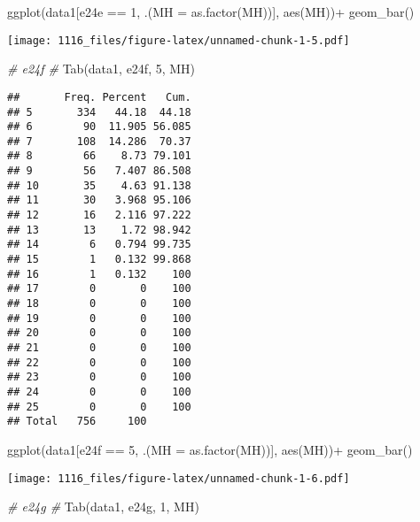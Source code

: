 \documentclass[
]{article}
\newenvironment{Shaded}{\begin{snugshade}}{\end{snugshade}}
\newcommand{\AttributeTok}[1]{\textcolor[rgb]{0.77,0.63,0.00}{#1}}
\newcommand{\CommentTok}[1]{\textcolor[rgb]{0.56,0.35,0.01}{\textit{#1}}}
\newcommand{\DecValTok}[1]{\textcolor[rgb]{0.00,0.00,0.81}{#1}}
\newcommand{\FunctionTok}[1]{\textcolor[rgb]{0.00,0.00,0.00}{#1}}
\newcommand{\NormalTok}[1]{#1}
\newcommand{\SpecialCharTok}[1]{\textcolor[rgb]{0.00,0.00,0.00}{#1}}
\newcommand{\StringTok}[1]{\textcolor[rgb]{0.31,0.60,0.02}{#1}}
\begin{document}
\begin{Shaded}
\begin{Highlighting}[]
\FunctionTok{ggplot}\NormalTok{(data1[e24e }\SpecialCharTok{==} \DecValTok{1}\NormalTok{, .(}\AttributeTok{MH =} \FunctionTok{as.factor}\NormalTok{(MH))], }\FunctionTok{aes}\NormalTok{(MH))}\SpecialCharTok{+}
    \FunctionTok{geom\_bar}\NormalTok{()}
\end{Highlighting}
\end{Shaded}

\texttt{[image: 1116\_files/figure-latex/unnamed-chunk-1-5.pdf]}

\begin{Shaded}
\begin{Highlighting}[]
\CommentTok{\# e24f \#}
\FunctionTok{Tab}\NormalTok{(data1, }\StringTok{\textquotesingle{}e24f\textquotesingle{}}\NormalTok{, }\DecValTok{5}\NormalTok{, }\StringTok{\textquotesingle{}MH\textquotesingle{}}\NormalTok{)}
\end{Highlighting}
\end{Shaded}

\begin{verbatim}
##       Freq. Percent   Cum.
## 5       334   44.18  44.18
## 6        90  11.905 56.085
## 7       108  14.286  70.37
## 8        66    8.73 79.101
## 9        56   7.407 86.508
## 10       35    4.63 91.138
## 11       30   3.968 95.106
## 12       16   2.116 97.222
## 13       13    1.72 98.942
## 14        6   0.794 99.735
## 15        1   0.132 99.868
## 16        1   0.132    100
## 17        0       0    100
## 18        0       0    100
## 19        0       0    100
## 20        0       0    100
## 21        0       0    100
## 22        0       0    100
## 23        0       0    100
## 24        0       0    100
## 25        0       0    100
## Total   756     100
\end{verbatim}

\begin{Shaded}
\begin{Highlighting}[]
\FunctionTok{ggplot}\NormalTok{(data1[e24f }\SpecialCharTok{==} \DecValTok{5}\NormalTok{, .(}\AttributeTok{MH =} \FunctionTok{as.factor}\NormalTok{(MH))], }\FunctionTok{aes}\NormalTok{(MH))}\SpecialCharTok{+}
    \FunctionTok{geom\_bar}\NormalTok{()}
\end{Highlighting}
\end{Shaded}

\texttt{[image: 1116\_files/figure-latex/unnamed-chunk-1-6.pdf]}

\begin{Shaded}
\begin{Highlighting}[]
\CommentTok{\# e24g \#}
\FunctionTok{Tab}\NormalTok{(data1, }\StringTok{\textquotesingle{}e24g\textquotesingle{}}\NormalTok{, }\DecValTok{1}\NormalTok{, }\StringTok{\textquotesingle{}MH\textquotesingle{}}\NormalTok{)}
\end{Highlighting}
\end{Shaded}
\end{document}

